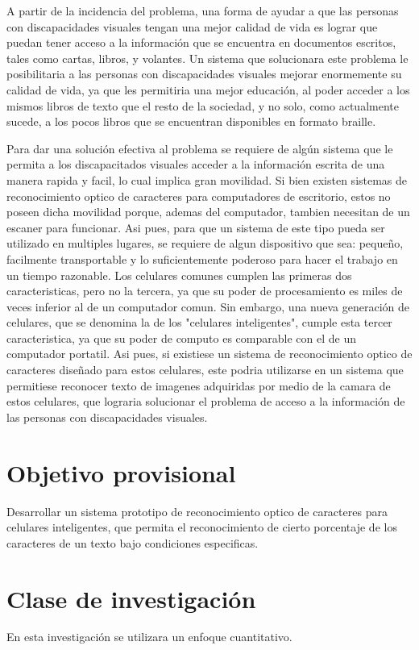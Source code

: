 \documentclass[a4paper, 11pt, oneside]{article}
\begin{document}
	A partir de la incidencia del problema, una forma de ayudar a que las personas con discapacidades visuales tengan una mejor calidad de vida es lograr que puedan tener acceso a la información que se encuentra en documentos escritos, tales como cartas, libros, y volantes. Un sistema que solucionara este problema le posibilitaria a las personas con discapacidades visuales mejorar enormemente su calidad de vida, ya que les permitiria una mejor educación, al poder acceder a los mismos libros de texto que el resto de la sociedad, y no solo, como actualmente sucede, a los pocos libros que se encuentran disponibles en formato braille.

	Para dar una solución efectiva al problema se requiere de algún sistema que le permita a los discapacitados visuales acceder a la información escrita de una manera rapida y facil, lo cual implica gran movilidad. Si bien existen sistemas de reconocimiento optico de caracteres para computadores de escritorio, estos no poseen dicha movilidad porque, ademas del computador, tambien necesitan de un escaner para funcionar. Asi pues, para que un sistema de este tipo pueda ser utilizado en multiples lugares, se requiere de algun dispositivo que sea: pequeño, facilmente transportable y lo suficientemente poderoso para hacer el trabajo en un tiempo razonable. Los celulares comunes cumplen las primeras dos caracteristicas, pero no la tercera, ya que su poder de procesamiento es miles de veces inferior al de un computador comun. Sin embargo, una nueva generación de celulares, que se denomina la de los "celulares inteligentes", cumple esta tercer caracteristica, ya que su poder de computo es comparable con el de un computador portatil. Asi pues, si existiese un sistema de reconocimiento optico de caracteres diseñado para estos celulares, este podria utilizarse en un sistema que permitiese reconocer texto de imagenes adquiridas por medio de la camara de estos celulares, que lograria solucionar el problema de acceso a la información de las personas con discapacidades visuales.
	\clearpage
	\section{Objetivo provisional}
	Desarrollar un sistema prototipo de reconocimiento optico de caracteres para celulares inteligentes, que permita el reconocimiento de cierto porcentaje de los caracteres de un texto bajo condiciones especificas.
	\clearpage
	\section{Clase de investigación}
	En esta investigación se utilizara un enfoque cuantitativo. 
	\clearpage
\end{document}
